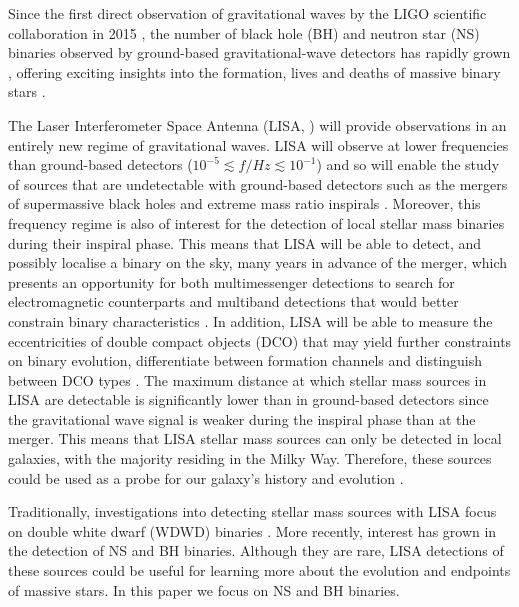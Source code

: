 Since the first direct observation of gravitational waves by the LIGO scientific collaboration in 2015 \citep{Abbott+2016_first_detection}, the number of black hole (BH) and neutron star (NS) binaries observed by ground-based gravitational-wave detectors has rapidly grown \citep{Abbott+2019_GWTC1,Abbott+2020_GWTC2}, offering exciting insights into the formation, lives and deaths of massive binary stars \citep[e.g.][]{Abbott+2021_GWTC2_inference}.


The Laser Interferometer Space Antenna (LISA, \citealp{Amaro-Seoane+2017}) will provide observations in an entirely new regime of gravitational waves. LISA will observe at lower frequencies than ground-based detectors ($10^{-5} \lesssim f / \unit{Hz} \lesssim 10^{-1}$) and so will enable the study of sources that are undetectable with ground-based detectors such as the mergers of supermassive black holes and extreme mass ratio inspirals \citep[e.g.][]{Begelman+1980, Klein+2016}. Moreover, this frequency regime is also of interest for the detection of local stellar mass binaries during their inspiral phase. This means that LISA will be able to detect, and possibly localise a binary on the sky, many years in advance of the merger, which presents an opportunity for both multimessenger detections to search for electromagnetic counterparts and multiband detections that would better constrain binary characteristics \citep[e.g.][]{Sesana+2016, Gerosa+2019}. In addition, LISA will be able to measure the eccentricities of double compact objects (DCO) that may yield further constraints on binary evolution, differentiate between formation channels and distinguish between DCO types \citep[e.g.][]{Nelemans+2001, Breivik+2016, Antonini+2017, Rodriguez+2018}. The maximum distance at which stellar mass sources in LISA are detectable is significantly lower than in ground-based detectors since the gravitational wave signal is weaker during the inspiral phase than at the merger. This means that LISA stellar mass sources can only be detected in local galaxies, with the majority residing in the Milky Way. Therefore, these sources could be used as a probe for our galaxy's history and evolution \citep[e.g.][]{Korol+2019}.

Traditionally, investigations into detecting stellar mass sources with LISA focus on double white dwarf (WDWD) binaries \citep{Nelemans+2001,Ruiter+2010,Yu+2010,Nissanke+2012,Korol+2017,Lamberts+2018}. More recently, interest has grown in the detection of NS and BH binaries. Although they are rare, LISA detections of these sources could be useful for learning more about the evolution and endpoints of massive stars. In this paper we focus on NS and BH binaries.


